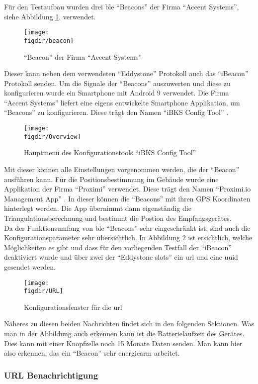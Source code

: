 Für den Testaufbau wurden drei \ac{ble} "`Beacons"' der Firma "`Accent Systems"', siehe Abbildung \ref{FIG:beacon}, verwendet.
\begin{figure}[h]
	\centering
	\texttt{[image: \\figdir/beacon]}
	\caption{"`Beacon"' der Firma "`Accent Systems"'}
	\label{FIG:beacon}
\end{figure}
Dieser kann neben dem verwendeten "`Eddystone"' Protokoll auch das "`iBeacon"' Protokoll senden. Um die Signale der "`Beacons"' auszuwerten und diese zu konfigurieren wurde ein Smartphone mit Android 9 verwendet. Die Firma "`Accent Systems"' liefert eine eigens entwickelte Smartphone Applikation, um "`Beacons"' zu konfigurieren. Diese trägt den Namen "`iBKS Config Tool"' \cite{BKS:WWW}.
\begin{figure}[hbtp]
	\centering
	\texttt{[image: \\figdir/Overview]}
	\caption{Hauptmenü des Konfigurationstools "`iBKS Config Tool"'}
	\label{FIG:overview}
\end{figure}
Mit dieser können alle Einstellungen vorgenommen werden, die der "`Beacon"' ausführen kann. Für die Positionsbestimmung im Gebäude wurde eine Applikation der Firma "`Proximi"' verwendet. Diese trägt den Namen "`Proximi.io Management App"' \cite{PRX:WWW}. In dieser können die "`Beacons"' mit ihren GPS Koordinaten hinterlegt werden. Die App übernimmt dann eigenständig die Triangulationsberechnung und bestimmt die Postion des Empfangsgerätes.\\  

\noindent Da der Funktionsumfang von \ac{ble} "`Beacons"' sehr eingeschränkt ist, sind auch die Konfigurationsparameter sehr übersichtlich. In Abbildung \ref{FIG:overview} ist ersichtlich, welche Möglichkeiten es gibt und dass für den vorliegenden Testfall der "`iBeacon"' deaktiviert wurde und über zwei der "`Eddystone slots"' ein \ac{url} und eine \ac{uuid} gesendet werden.
\begin{figure}[hbtp]
	\centering
	\texttt{[image: \\figdir/URL]}
	\caption{Konfigurationsfenster für die \ac{url}}
	\label{FIG:url}
\end{figure}
Näheres zu diesen beiden Nachrichten findet sich in den folgenden Sektionen. Was man in der Abbildung auch erkennen kann ist die Batterielaufzeit des Gerätes. Dies kann mit einer Knopfzelle noch 15 Monate Daten senden. Man kann hier also erkennen, das ein "`Beacon"' sehr energiearm arbeitet.\\

\subsubsection{URL Benachrichtigung}
\label{sss:ibeacon:url}


